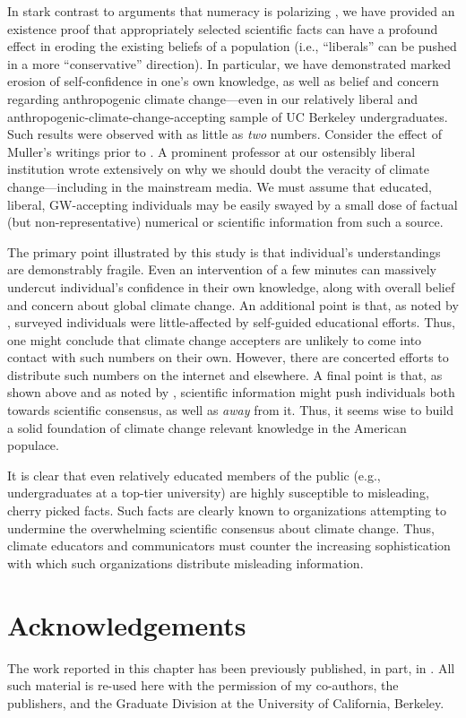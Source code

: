 In stark contrast to arguments that numeracy is polarizing
\parencite{kahan_polarizing_2012}, we have provided an existence proof that
appropriately selected scientific facts can have a profound effect in eroding
the existing beliefs of a population (i.e., “liberals” can be pushed in a more
“conservative” direction). In particular, we have demonstrated marked erosion of
self-confidence in one's own knowledge, as well as belief and concern regarding
anthropogenic climate change---even in our relatively liberal and
anthropogenic-climate-change-accepting sample of UC Berkeley undergraduates.
Such results were observed with as little as \emph{two} numbers.
Consider the effect of Muller's writings prior to \textcite{rohde_new_2013}. A
prominent professor at our ostensibly liberal institution wrote extensively on
why we should doubt the veracity of climate change---including in the mainstream
media. We must assume that educated, liberal, GW-accepting individuals may be
easily swayed by a small dose of factual (but non-representative) numerical or
scientific information from such a source.

The primary point illustrated by this study is that individual's understandings
are demonstrably fragile. Even an intervention of a few minutes can massively
undercut individual's confidence in their own knowledge, along with overall
belief and concern about global climate change. An additional point is that, as
noted by \textcite{kahan_polarizing_2012,mccright_politicization_2011}, surveyed
individuals were little-affected by self-guided educational efforts. Thus, one
might conclude that climate change accepters are unlikely to come into contact
with such numbers on their own.  However, there are concerted efforts to
distribute such numbers on the internet and elsewhere. A final point is that, as
shown above and as noted by \textcite{mccright_politicization_2011}, scientific
information might push individuals both towards scientific consensus, as well as
\emph{away} from it.  Thus, it seems wise to build a solid foundation of climate
change relevant knowledge in the American populace. 

It is clear that even relatively educated members of the public (e.g.,
undergraduates at a top-tier university) are highly susceptible to misleading,
cherry picked facts. Such facts are clearly known to organizations attempting to
undermine the overwhelming scientific consensus about climate change. Thus,
climate educators and communicators must counter the increasing sophistication
with which such organizations distribute misleading information.

\section*{Acknowledgements}

The work reported in this chapter has been previously published, in part, in
\textcite{clark_knowledge_inpress}.  All such material is re-used here with the
permission of my co-authors, the publishers, and the Graduate Division at the
University of California, Berkeley.
